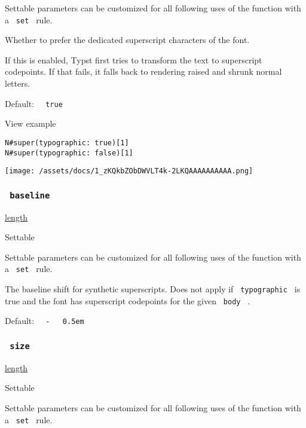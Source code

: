 \label{parameters-typographic-settable-tooltip}
Settable parameters can be customized for all following uses of the
function with a \texttt{\ set\ } rule.

Whether to prefer the dedicated superscript characters of the font.

If this is enabled, Typst first tries to transform the text to
superscript codepoints. If that fails, it falls back to rendering raised
and shrunk normal letters.

Default: \texttt{\ }{\texttt{\ true\ }}\texttt{\ }


View example

\begin{verbatim}
N#super(typographic: true)[1]
N#super(typographic: false)[1]
\end{verbatim}

\texttt{[image: /assets/docs/1\_zKQkbZObDWVLT4k-2LKQAAAAAAAAAA.png]}

\subsubsection{\texorpdfstring{\texttt{\ baseline\ }}{ baseline }}\label{parameters-baseline}

\href{/docs/reference/layout/length/}{length}

{{ Settable }}

\label{parameters-baseline-settable-tooltip}
Settable parameters can be customized for all following uses of the
function with a \texttt{\ set\ } rule.

The baseline shift for synthetic superscripts. Does not apply if
\texttt{\ typographic\ } is true and the font has superscript codepoints
for the given \texttt{\ body\ } .

Default:
\texttt{\ }{\texttt{\ -\ }}\texttt{\ }{\texttt{\ 0.5em\ }}\texttt{\ }

\subsubsection{\texorpdfstring{\texttt{\ size\ }}{ size }}\label{parameters-size}

\href{/docs/reference/layout/length/}{length}

{{ Settable }}

\label{parameters-size-settable-tooltip}
Settable parameters can be customized for all following uses of the
function with a \texttt{\ set\ } rule.

